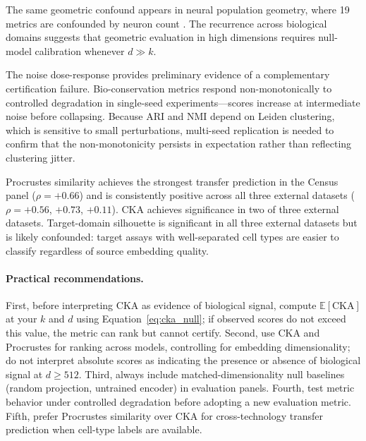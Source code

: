 \documentclass[11pt]{article}
\begin{document}
The same geometric confound appears in neural population geometry, where
19 metrics are confounded by neuron count \citep{tower2026bracket}. The
recurrence across biological domains suggests that geometric evaluation
in high dimensions requires null-model calibration whenever $d \gg k$.

The noise dose-response provides preliminary evidence of a
complementary certification failure. Bio-conservation metrics respond
non-monotonically to controlled degradation in single-seed
experiments---scores increase at intermediate noise before
collapsing. Because ARI and NMI depend on Leiden clustering, which is
sensitive to small perturbations, multi-seed replication is needed to
confirm that the non-monotonicity persists in expectation rather than
reflecting clustering jitter.

Procrustes similarity achieves the strongest transfer prediction in the
Census panel ($\rho = +0.66$) and is consistently positive across all
three external datasets ($\rho = +0.56$, $+0.73$, $+0.11$). CKA
achieves significance in two of three external datasets. Target-domain
silhouette is significant in all three external datasets but is likely
confounded: target assays with well-separated cell types are easier to
classify regardless of source embedding quality.

\paragraph{Practical recommendations.} First, before interpreting CKA as
evidence of biological signal, compute $\mathbb{E}[\mathrm{CKA}]$ at
your $k$ and $d$ using Equation~\ref{eq:cka_null}; if observed scores do
not exceed this value, the metric can rank but cannot certify. Second,
use CKA and Procrustes for ranking across models, controlling for
embedding dimensionality; do not interpret absolute scores as indicating
the presence or absence of biological signal at $d \geq 512$. Third,
always include matched-dimensionality null baselines (random projection,
untrained encoder) in evaluation panels. Fourth, test metric behavior
under controlled degradation before adopting a new evaluation metric.
Fifth, prefer Procrustes similarity over CKA for cross-technology
transfer prediction when cell-type labels are available.
\end{document}
